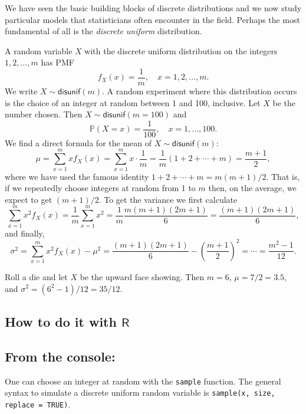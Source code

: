 \documentclass[captions=tableheading]{scrbook}
\begin{document}
We have seen the basic building blocks of discrete distributions and we now study particular models that statisticians often encounter in the field. Perhaps the most fundamental of all is the \emph{discrete uniform} distribution.

A random variable \(X\) with the discrete uniform distribution on the integers \(1,2,\ldots,m\) has PMF
\begin{equation}
f_{X}(x)=\frac{1}{m},\quad x=1,2,\ldots,m.
\end{equation}
We write \(X\sim\mathsf{disunif}(m)\). A random experiment where this distribution occurs is the choice of an integer at random between 1 and 100, inclusive. Let \(X\) be the number chosen. Then \(X\sim\mathsf{disunif}(m=100)\) and
\[
\mathbb{P}(X=x)=\frac{1}{100},\quad x=1,\ldots,100.
\]
We find a direct formula for the mean of \(X\sim\mathsf{disunif}(m)\):
\begin{equation}
\mu=\sum_{x=1}^{m}xf_{X}(x)=\sum_{x=1}^{m}x\cdot\frac{1}{m}=\frac{1}{m}(1+2+\cdots+m)=\frac{m+1}{2},
\end{equation}
where we have used the famous identity \(1+2+\cdots+m=m(m+1)/2\). That is, if we repeatedly choose integers at random from 1 to \(m\) then, on the average, we expect to get \((m+1)/2\). To get the variance we first calculate
\[
\sum_{x=1}^{m}x^{2}f_{X}(x)=\frac{1}{m}\sum_{x=1}^{m}x^{2}=\frac{1}{m}\frac{m(m+1)(2m+1)}{6}=\frac{(m+1)(2m+1)}{6},
\]
and finally,
\begin{equation}
\sigma^{2}=\sum_{x=1}^{m}x^{2}f_{X}(x)-\mu^{2}=\frac{(m+1)(2m+1)}{6}-\left(\frac{m+1}{2}\right)^{2}=\cdots=\frac{m^{2}-1}{12}.
\end{equation}

\begin{example}
Roll a die and let \(X\) be the upward face showing. Then \(m=6\), \(\mu=7/2=3.5\), and \(\sigma^{2}=(6^{2}-1)/12=35/12\).
\end{example}
\subsection{How to do it with \(\mathsf{R}\)}
\label{sec-5-2-1}
\subsection{From the console:}
\label{sec-5-2-2}

One can choose an integer at random with the \texttt{sample} function. The general syntax to simulate a discrete uniform random variable is \texttt{sample(x, size, replace = TRUE)}.
\end{document}

